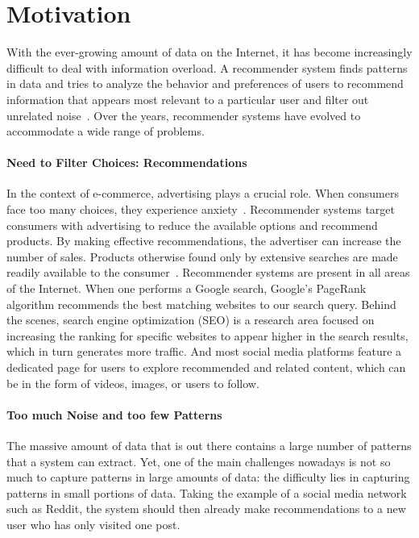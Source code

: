 
\section{Motivation}
With the ever-growing amount of data on the Internet, it has become increasingly difficult to deal with information overload. A recommender system finds patterns in data and tries to analyze the behavior and preferences of users to recommend information that appears most relevant to a particular user and filter out unrelated noise~\cite{isinkaye2015recommendation}. Over the years, recommender systems have evolved to accommodate a wide range of problems.

\paragraph{Need to Filter Choices: Recommendations}
In the context of e-commerce, advertising plays a crucial role. When consumers face too many choices, they experience anxiety~\cite{schwartz2004doing}. Recommender systems target consumers with advertising to reduce the available options and recommend products. By making effective recommendations, the advertiser can increase the number of sales.
Products otherwise found only by extensive searches are made readily available to the consumer~\cite{rohde2018recogym}. Recommender systems are present in all areas of the Internet. When one performs a Google search, Google's PageRank algorithm recommends the best matching websites to our search query. Behind the scenes, search engine optimization (SEO) is a research area focused on increasing the ranking for specific websites to appear higher in the search results, which in turn generates more traffic. And most social media platforms feature a dedicated page for users to explore recommended and related content, which can be in the form of videos, images, or users to follow.

\paragraph{Too much Noise and too few Patterns}
The massive amount of data that is out there contains a large number of patterns that a system can extract. Yet, one of the main challenges nowadays is not so much to capture patterns in large amounts of data: the difficulty lies in capturing patterns in small portions of data. Taking the example of a social media network such as Reddit, the system should then already make recommendations to a new user who has only visited one post.

